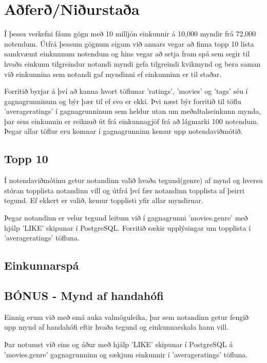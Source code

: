 \documentclass[11pt,a4paper]{amsart}
\theoremstyle{plain}
\theoremstyle{definition}
\theoremstyle{remark}
\begin{document}


\section{Aðferð/Niðurstaða}
Í þessu verkefni fáum gögn með 10 milljón einkunnir á 10,000 myndir frá 72,000 notendum.
Útfrá þessum gögnum eigum við annars vegar að finna topp 10 lista samkvæmt einkunnum notendum og hins vegar að setja fram spá sem segir til hvaða einkunn tilgreindur notandi myndi gefa tilgreindi kvikmynd og bera saman við einkunnina sem notandi gaf myndinni ef einkunninn er til staðar.  
\\\par
Forritið byrjar á því að kanna hvort töflunar 'ratings', 'movies' og 'tags' séu í gagnagrunninum og býr þær til ef svo er ekki. Þvi næst býr forritið til töflu 'averageratings' í gagnagrunninum sem heldur utan um meðaltalseinkunn mynda, þar sem einkunnin er reiknuð út frá einkunnagjöf frá að lágmarki 100 notendum. Þegar allar töflur eru komnar í gagnagrunninn kemur upp notendaviðmótið.

\subsection{Topp 10}
Í notendaviðmótinu getur notandinn valið hvaða tegund(genre) af mynd og hversu stóran topplista notandinn vill og útfrá því fær notandinn topplista af þeirri tegund. Ef ekkert er valið, kemur topplisti yfir allar myndirnar.\par Þegar notandinn er velur tegund leitum við í gagnagrunni 'movies.genre' með hjálp 'LIKE' skipunar í PostgreSQL. Forritið sækir upplýsingar um topplista í 'averageratings' töfluna.

\subsection{Einkunnarspá}



\subsection{BÓNUS - Mynd af handahófi}
Einnig erum við með smá auka valmöguleika, þar sem notandinn getur fengið upp mynd af handahófi eftir hvaða tegund og einkunnarskala hann vill.\par Þar notumst við eins og áður með hjálp 'LIKE' skipunar í PostgreSQL á 'movies.genre' gagnagrunninn og sækjum einkunnir í 'averageratings' töfluna. 
\end{document}
